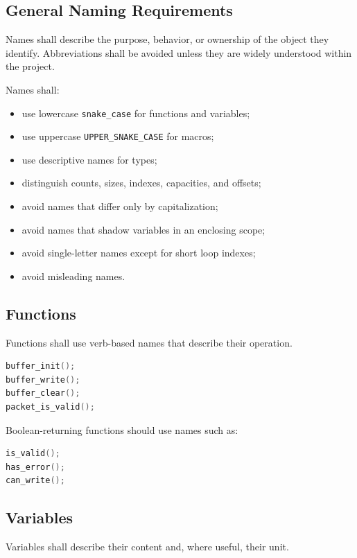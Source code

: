 \subsection{General Naming Requirements}

Names shall describe the purpose, behavior, or ownership of the object they identify. Abbreviations shall be avoided unless they are widely understood within the project.

Names shall:

\begin{itemize}
	\item use lowercase \texttt{snake\_case} for functions and variables;
	\item use uppercase \texttt{UPPER\_SNAKE\_CASE} for macros;
	\item use descriptive names for types;
	\item distinguish counts, sizes, indexes, capacities, and offsets;
	\item avoid names that differ only by capitalization;
	\item avoid names that shadow variables in an enclosing scope;
	\item avoid single-letter names except for short loop indexes;
	\item avoid misleading names.
\end{itemize}

\subsection{Functions}

Functions shall use verb-based names that describe their operation.

\begin{lstlisting}[language=C]
buffer_init();
buffer_write();
buffer_clear();
packet_is_valid();
\end{lstlisting}

Boolean-returning functions should use names such as:

\begin{lstlisting}[language=C]
is_valid();
has_error();
can_write();
\end{lstlisting}

\subsection{Variables}

Variables shall describe their content and, where useful, their unit.


